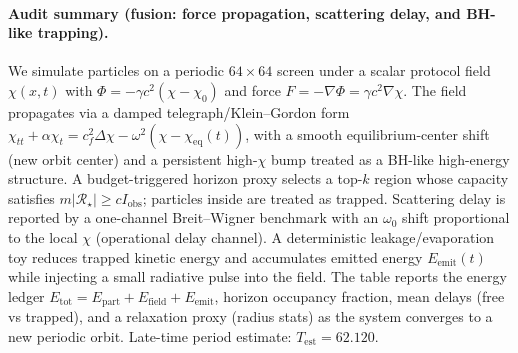 \paragraph{Audit summary (fusion: force propagation, scattering delay, and BH-like trapping).} \AuditTag We simulate particles on a periodic $64\times64$ screen under a scalar protocol field $\chi(x,t)$ with $\Phi=-\gamma c^2(\chi-\chi_0)$ and force $F=-\nabla\Phi=\gamma c^2\nabla\chi$. The field propagates via a damped telegraph/Klein--Gordon form $\chi_{tt}+\alpha\chi_t=c_f^2\Delta\chi-\omega^2(\chi-\chi_{\mathrm{eq}}(t))$, with a smooth equilibrium-center shift (new orbit center) and a persistent high-$\chi$ bump treated as a BH-like high-energy structure. A budget-triggered horizon proxy selects a top-$k$ region whose capacity satisfies $m|\mathcal R_\star|\ge cI_{\mathrm{obs}}$; particles inside are treated as trapped. Scattering delay is reported by a one-channel Breit--Wigner benchmark with an $\omega_0$ shift proportional to the local $\chi$ (operational delay channel). A deterministic leakage/evaporation toy reduces trapped kinetic energy and accumulates emitted energy $E_\mathrm{emit}(t)$ while injecting a small radiative pulse into the field. The table reports the energy ledger $E_\mathrm{tot}=E_\mathrm{part}+E_\mathrm{field}+E_\mathrm{emit}$, horizon occupancy fraction, mean delays (free vs trapped), and a relaxation proxy (radius stats) as the system converges to a new periodic orbit. Late-time period estimate: $T_{\mathrm{est}}=62.120$.